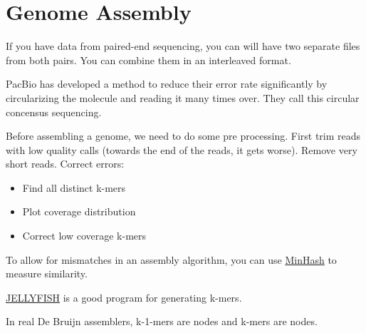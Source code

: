 \documentclass{article}
\begin{document}
\section{Genome Assembly}

If you have data from paired-end sequencing, you can will have two separate files from both pairs. You can combine them in an interleaved format.

PacBio has developed a method to reduce their error rate significantly by circularizing the molecule and reading it many times over. They call this circular concensus sequencing.

Before assembling a genome, we need to do some pre processing. First trim reads with low quality calls (towards the end of the reads, it gets worse). Remove very short reads. Correct errors:
\begin{itemize}
    \item Find all distinct k-mers
    \item Plot coverage distribution
    \item Correct low coverage k-mers
\end{itemize}

To allow for mismatches in an assembly algorithm, you can use \href{https://en.wikipedia.org/wiki/MinHash}{MinHash} to measure similarity.

\href{https://www.cbcb.umd.edu/software/jellyfish/}{JELLYFISH} is a good program for generating k-mers.

In real De Bruijn assemblers, k-1-mers are nodes and k-mers are nodes.
\end{document}
